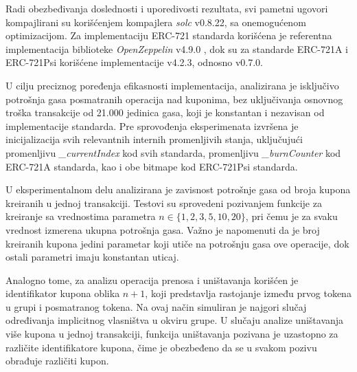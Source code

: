 Radi obezbeđivanja doslednosti i uporedivosti rezultata, svi pametni ugovori kompajlirani su korišćenjem kompajlera \textit{solc} v0.8.22, sa onemogućenom optimizacijom. Za implementaciju ERC-721 standarda korišćena je referentna implementacija biblioteke \textit{OpenZeppelin} v4.9.0 \cite{openzeppelin}, dok su za standarde ERC-721A i ERC-721Psi korišćene implementacije v4.2.3, odnosno v0.7.0.

U cilju preciznog poređenja efikasnosti implementacija, analizirana je isključivo potrošnja gasa posmatranih operacija nad kuponima, bez uključivanja osnovnog troška transakcije od 21.000 jedinica gasa, koji je konstantan i nezavisan od implementacije standarda. Pre sprovođenja eksperimenata izvršena je inicijalizacija svih relevantnih internih promenljivih stanja, uključujući promenljivu \textit{\_currentIndex} kod svih standarda, promenljivu \textit{\_burnCounter} kod ERC-721A standarda, kao i obe bitmape kod ERC-721Psi standarda.

U eksperimentalnom delu analizirana je zavisnost potrošnje gasa od broja kupona kreiranih u jednoj transakciji. Testovi su sprovedeni pozivanjem funkcije za kreiranje sa vrednostima parametra $n \in \{1, 2, 3, 5, 10, 20\}$, pri čemu je za svaku vrednost izmerena ukupna potrošnja gasa. Važno je napomenuti da je broj kreiranih kupona jedini parametar koji utiče na potrošnju gasa ove operacije, dok ostali parametri imaju konstantan uticaj.

Analogno tome, za analizu operacija prenosa i uništavanja korišćen je identifikator kupona oblika $n+1$, koji predstavlja rastojanje između prvog tokena u grupi i posmatranog tokena. Na ovaj način simuliran je najgori slučaj određivanja implicitnog vlasništva u okviru grupe. U slučaju analize uništavanja više kupona u jednoj transakciji, funkcija uništavanja pozivana je uzastopno za različite identifikatore kupona, čime je obezbeđeno da se u svakom pozivu obrađuje različiti kupon.

